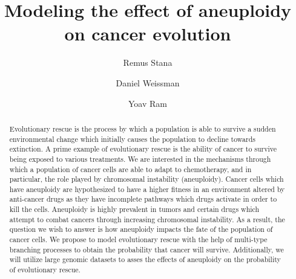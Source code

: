 \documentclass[11pt,a4paper]{article}
\begin{document}
\title{Modeling the effect of aneuploidy on cancer evolution}
\author[1]{Remus Stana}
\author[2]{‪Daniel Weissman}
\author[1]{Yoav Ram}
\maketitle
\begin{abstract}
Evolutionary rescue is the process by which a population is able to survive a sudden environmental change which initially causes the population to decline towards extinction. A prime example of evolutionary rescue is the ability of cancer to survive being exposed to various treatments. We are interested in the mechanisms through which a population of cancer cells are able to adapt to chemotherapy, and in particular, the role played by chromosomal instability (aneuploidy). Cancer cells which have aneuploidy are hypothesized to have a higher fitness in an environment altered by anti-cancer drugs as they have incomplete pathways which drugs activate in order to kill the cells. Aneuploidy is highly prevalent in tumors and certain drugs which attempt to combat cancers through increasing chromosomal instability. As a result, the question we wish to answer is how aneuploidy impacts the fate of the population of cancer cells. We propose to model evolutionary rescue with the help of multi-type branching processes to obtain the probability that cancer will survive. Additionally, we will utilize large genomic datasets to asses the effects of aneuploidy on the probability of evolutionary rescue.
\end{abstract}
\end{document}
